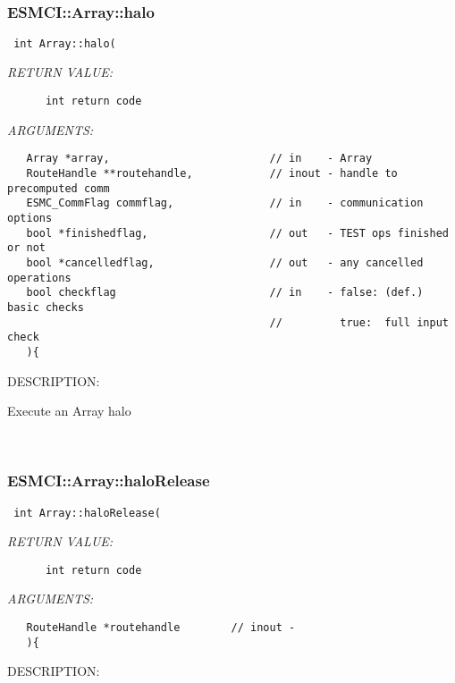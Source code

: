 
\mbox{}\hrulefill\
 
\subsubsection [ESMCI::Array::halo] {ESMCI::Array::halo}


  
\begin{verbatim} int Array::halo(\end{verbatim}{\em RETURN VALUE:}
\begin{verbatim}      int return code\end{verbatim}{\em ARGUMENTS:}
\begin{verbatim}   Array *array,                         // in    - Array
   RouteHandle **routehandle,            // inout - handle to precomputed comm
   ESMC_CommFlag commflag,               // in    - communication options
   bool *finishedflag,                   // out   - TEST ops finished or not
   bool *cancelledflag,                  // out   - any cancelled operations
   bool checkflag                        // in    - false: (def.) basic checks
                                         //         true:  full input check
   ){\end{verbatim}
{\sf DESCRIPTION:\\ }


      Execute an Array halo
   
 
\mbox{}\hrulefill\
 
\subsubsection [ESMCI::Array::haloRelease] {ESMCI::Array::haloRelease}


  
\begin{verbatim} int Array::haloRelease(\end{verbatim}{\em RETURN VALUE:}
\begin{verbatim}      int return code\end{verbatim}{\em ARGUMENTS:}
\begin{verbatim}   RouteHandle *routehandle        // inout -
   ){\end{verbatim}
{\sf DESCRIPTION:\\ }


